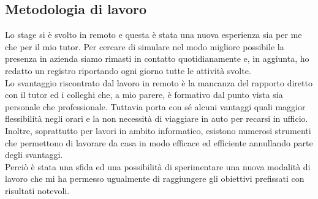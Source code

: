 \subsection{Metodologia di lavoro}
Lo stage si è svolto in remoto e questa è stata una nuova esperienza sia per me che per il mio tutor. Per cercare di simulare nel modo migliore possibile la presenza in azienda siamo rimasti in contatto quotidianamente e, in aggiunta, ho redatto un registro riportando ogni giorno tutte le attività svolte. \\
Lo svantaggio riscontrato dal lavoro in remoto è la mancanza del rapporto diretto con il tutor ed i colleghi che, a mio parere, è formativo dal punto vista sia personale che professionale. Tuttavia porta con sé alcuni vantaggi quali maggior flessibilità negli orari e la non necessità di viaggiare in auto per recarsi in ufficio. Inoltre, soprattutto per lavori in ambito informatico, esistono numerosi strumenti che permettono di lavorare da casa in modo efficace ed efficiente annullando parte degli svantaggi. \\
Perciò è stata una sfida ed una possibilità di sperimentare una nuova modalità di lavoro che mi ha permesso ugualmente di raggiungere gli obiettivi prefissati con risultati notevoli.
